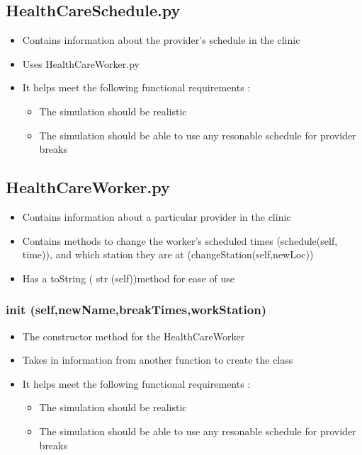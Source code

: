 \documentclass[12pt]{article}
\begin{document}
\subsection{HealthCareSchedule.py}
\begin{itemize}  
\item Contains information about the provider's schedule in the clinic
\item Uses HealthCareWorker.py
\item It helps meet the following functional requirements :
\begin{itemize}
	\item The simulation should be realistic
	\item The simulation should be able to use any resonable schedule for provider breaks
\end{itemize}
\end{itemize}

\subsection{HealthCareWorker.py}
\begin{itemize}  
\item Contains information about a particular provider in the clinic
\item Contains methods to change the worker's scheduled times (schedule(self, time)), and which station they are at (changeStation(self,newLoc))
\item Has a toString ( str (self))method for ease of use
\end{itemize}
\subsubsection{ init (self,newName,breakTimes,workStation)}
\begin{itemize}
	\item The constructor method for the HealthCareWorker
	\item Takes in information from another function to create the class
	\item It helps meet the following functional requirements :
	\begin{itemize}
		\item The simulation should be realistic
		\item The simulation should be able to use any resonable schedule for provider breaks
	\end{itemize}
\end{itemize}
\end{document}
